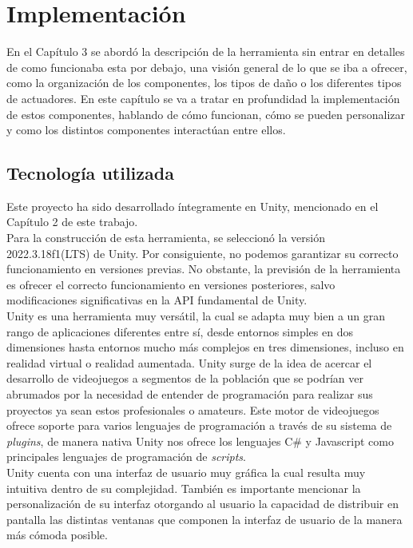 \setcounter{secnumdepth}{3} %
\chapter{Implementaci\'on}
\label{cap:implementacion}
En el Capítulo 3 se abordó la descripción de la herramienta sin entrar en detalles de como funcionaba esta por debajo, una visión general de lo que se iba a ofrecer, como la organización de los componentes, los tipos de daño o los diferentes tipos de actuadores. En este capítulo se va a tratar en profundidad la implementación de estos componentes, hablando de cómo funcionan, cómo se pueden personalizar y como los distintos componentes interactúan entre ellos.


\section{Tecnología utilizada}
Este proyecto ha sido desarrollado íntegramente en Unity, mencionado en el Capítulo 2 de este trabajo.\\
Para la construcción de esta herramienta, se seleccionó la versión 2022.3.18f1(LTS) de Unity. Por consiguiente, no podemos garantizar su correcto funcionamiento en versiones previas. No obstante, la previsión de la herramienta es ofrecer el correcto funcionamiento en versiones posteriores, salvo modificaciones significativas en la API fundamental de Unity.\\
Unity es una herramienta muy versátil, la cual se adapta muy bien a un gran rango de aplicaciones diferentes entre sí, desde entornos simples en dos dimensiones hasta entornos mucho más complejos en tres dimensiones, incluso en realidad virtual o realidad aumentada.
Unity surge de la idea de acercar el desarrollo de videojuegos a segmentos de la población que se podrían ver abrumados por la necesidad de entender de programación para realizar sus proyectos ya sean estos profesionales o amateurs. Este motor de videojuegos ofrece soporte para varios lenguajes de programación a través de su sistema de \textit{plugins}, de manera nativa Unity nos ofrece los lenguajes C\# y Javascript como principales lenguajes de programación de \textit{scripts}.\\

Unity cuenta con una interfaz de usuario muy gráfica la cual resulta muy intuitiva dentro de su complejidad. También es importante mencionar la personalización de su interfaz otorgando al usuario la capacidad de distribuir en pantalla las distintas ventanas que componen la interfaz de usuario de la manera más cómoda posible.\\

